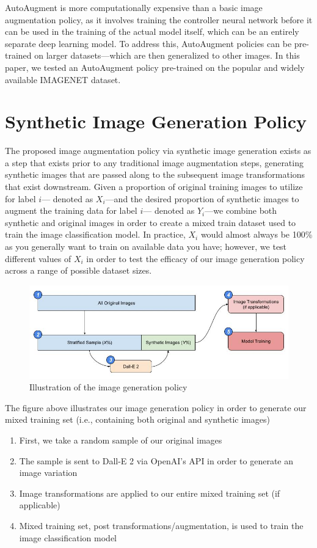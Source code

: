 \documentclass [MS] {uclathes}
\begin{document}
AutoAugment is more computationally expensive than a basic image augmentation policy, as it involves training the 
controller neural network before it can be used in the training of the actual model itself, which can be an entirely 
separate deep learning model. To address this, AutoAugment policies can be pre-trained on larger datasets---which are 
then generalized to other images. In this paper, we tested an AutoAugment policy pre-trained on the popular and widely 
available IMAGENET dataset.

\section{Synthetic Image Generation Policy}
The proposed image augmentation policy via synthetic image generation exists as a step that exists prior to any 
traditional image augmentation steps, generating synthetic images that are passed along to the subsequent image 
transformations that exist downstream. Given a proportion of original training images to utilize for label \(i\)---
denoted as \(X_{i}\)---and the desired proportion of synthetic images to augment the training data for label \(i\)---
denoted as \(Y_{i}\)---we combine both synthetic and original images in order to create a mixed train dataset used to 
train the image classification model. In practice, \(X_{i}\) would almost always be 100\% as you generally want to train
on available data you have; however, we test different values of \(X_{i}\) in order to test the efficacy of our image 
generation policy across a range of possible dataset sizes.


\begin{figure} [H]
    \centering
    \includegraphics[width=1\linewidth]{figures/image_generation_policy.jpg}
    \caption{Illustration of the image generation policy}
    \label{fig:enter-label}
\end{figure}

The figure above illustrates our image generation policy in order to generate our mixed training set (i.e., containing 
both original and synthetic images)
\begin{enumerate}
    \item First, we take a random sample of our original images
    \item The sample is sent to Dall-E 2 via OpenAI's API in order to generate an image variation
    \item Image transformations are applied to our entire mixed training set (if applicable)
    \item Mixed training set, post transformations/augmentation, is used to train the image classification model
\end{enumerate}
\end{document}
